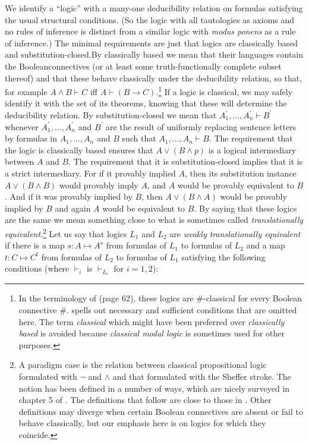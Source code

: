 \documentclass[11pt]{article}
\begin{document}
We identify a ``logic'' with a many-one deducibility relation on formulas satisfying the usual structural conditions. (So the logic with all tautologies as axioms and no rules of inference is distinct from a similar logic with \textit{modus ponens} as a rule of inference.) The minimal requirements are just that logics are classically based and substitution-closed.\footnotemark{ }By classically based we mean that their languages contain the Booleanconnectives (or at least some truth-functionally complete subset thereof) and that these behave classically under the deducibility relation, so that, for example $A \wedge B \vdash C$ iff $A \vdash (B \rightarrow C)$.\footnote{In the terminology of \citet{Humberstone.2011} (page 62), these logics are $\#$-classical for every Boolean connective $\#$. \citet{Humberstone.2011} spells out necessary and sufficient conditions that are omitted here. The term \textit{classical} which might have been preferred over \textit{classically based} is avoided because \textit{classical modal logic} is sometimes used for other purposes.} If a logic is classical, we may safely identify it with the set of its theorems, knowing that these will determine the deducibility relation. By substitution-closed we mean that $A_1^\prime,{\ldots},A_n^\prime \vdash B^\prime$ whenever $A_1^\prime,{\ldots},A_n^\prime$ and $B^\prime$ are the result of uniformly replacing sentence letters by formulas in $A_1,{\ldots},A_n$ and $B$ such that $A_1,{\ldots},A_n \vdash B$. The requirement that the logic is classically based ensures that $A\vee (B\wedge p)$ is a logical intermediary between $A$ and $B$. The requirement that it is substitution-closed implies that it is a strict intermediary. For if it provably implied $A$, then its substitution instance $A\vee (B\wedge B)$ would provably imply $A$, and $A$ would be provably equivalent to $B$. And if it was provably implied by $B$, then $A\vee (B\wedge A)$ would be provably implied by $B$ and again $A$ would be equivalent to $B$. By saying that these logics are the same we mean something close to what is sometimes called \textit{translationally equivalent}.\footnote{A paradigm case is the relation between classical propositional logic formulated with $\neg$ and $\wedge$ and that formulated with the Sheffer stroke. The notion has been defined in a number of ways, which are nicely surveyed in chapter 5 of \citet{French2010}. The definitions that follow are close to those in \citet{Kuhn.1978}. Other definitions may diverge when certain Boolean connectives are absent or fail to behave classically, but our emphasis here is on logics for which they coincide.} Let us say that logics $L_1$ and $L_2$ are \textit{weakly translationally equivalent} if there is a map $s\colon A{\mapsto}A^s$ from formulas of $L_1$ to formulas of $L_2$ and a map $t\colon C{\mapsto}C^t$ from formulas of $L_2$ to formulas of $L_1$ satisfying the following conditions (where $\vdash_i$ is $\vdash_{L_i}$ for $i=1,2$):
\end{document}
